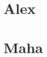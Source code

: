 \documentclass[journal,draftclsnofoot,onecolumn,12pt]{IEEEtran}
\theoremstyle{definition}
\begin{document}
\section{Alex}



\section{Maha}








	
\newpage
	
	
	
\end{document}
